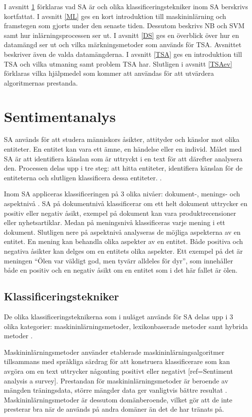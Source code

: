 \documentclass{kaumasters} %
\begin{document}
I avsnitt \ref{SA} förklaras vad SA är och olika klassificeringstekniker inom SA berskrivs kortfattat. I avsnitt \ref{ML} ges en kort introduktion till maskininlärning och framstegen som gjorts under den senaste tiden. Dessutom beskrivs NB och SVM samt hur inlärningsprocessen ser ut. I avsnitt \ref{DS} ges en överblick över hur en datamängd ser ut och vilka märkningsmetoder som används för TSA. Avsnittet beskriver även de valda datamängderna. I avsnitt \ref{TSA} ges en introduktion till TSA och vilka utmaning samt problem TSA har. Slutligen i avsnitt \ref{TSAev} förklaras vilka hjälpmedel som kommer att användas för att utvärdera algoritmernas prestanda.


\section{Sentimentanalys} \label{SA}
SA används för att studera människors åsikter, attityder och känslor mot olika entiteter. En entitet kan vara ett ämne, en händelse eller en individ. Målet med SA är att identifiera känslan som är uttryckt i en text för att därefter analysera den. Processen delas upp i tre steg: att hitta entiteter, identifiera känslan för de entiteterna och slutligen klassificera dessa entiteter. \cite{SAsurvey}.

Inom SA appliceras klassificeringen på 3 olika nivåer: dokument-, menings- och aspektnivå \cite{SAsurvey}. SA på dokumentnivå klassificerar om ett helt dokument uttrycker en positiv eller negativ åsikt, exempel på dokument kan vara produktrecensioner eller nyhetsartiklar. Medan på meningsnivå klassificeras varje mening i ett dokument. Slutligen nere på aspektnivå analyseras de möjliga aspekterna av en entitet. En mening kan behandla olika aspekter av en entitet. Både positiva och negativa åsikter kan delges om en entitets olika aspekter. Ett exempel på det är meningen “Ölen var väldigt god, men tyvärr alldeles för dyr”, som innehåller både en positiv och en negativ åsikt om en entitet som i det här fallet är ölen.
\subsection{Klassificeringstekniker} \label{SAkt}
De olika klassificeringsteknikerna som i nuläget används för SA delas upp i 3 olika kategorier: maskininlärningsmetoder, lexikonbaserade metoder samt hybrida metoder \cite{SAsurvey}. 

Maskininlärningsmetoder använder etablerade maskininlärningsalgoritmer tillsammans med språkliga särdrag för att konstruera klassificerare som kan avgöra om en text uttrycker någonting positivt eller negativt [ref=Sentiment analysis a survey]. Prestandan för maskininlärningsmetoder är beroende av mängden träningsdata, större mängder data ger vanligtvis bättre resultat \cite{TSAsurvey}. Maskininlärningsmetoder är dessutom domänberoende, vilket gör att de inte presterar bra när de används på andra domäner än det de har tränats på. 
\end{document}
